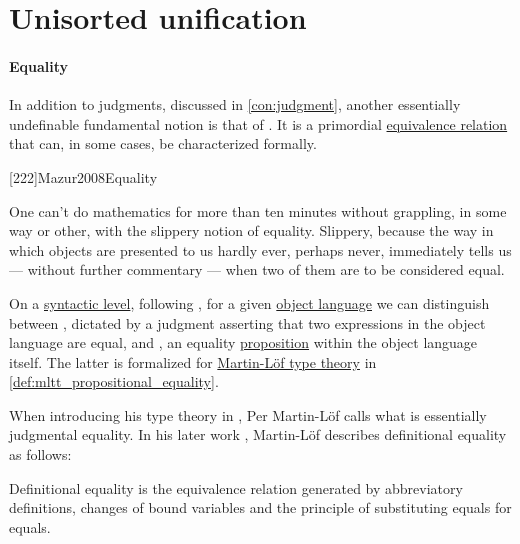 \section{Unisorted unification}\label{sec:unisorted_unification}

\paragraph{Equality}

\begin{concept}\label{con:equality}
  In addition to judgments, discussed in \cref{con:judgment}, another essentially undefinable fundamental notion is that of . It is a primordial \hyperref[def:equivalence_relation]{equivalence relation} that can, in some cases, be characterized formally.

  [222]{Mazur2008Equality}
  \begin{displayquote}
    One can't do mathematics for more than ten minutes without grappling, in some way or other, with the slippery notion of equality. Slippery, because the way in which objects are presented to us hardly ever, perhaps never, immediately tells us --- without further commentary --- when two of them are to be considered equal.
  \end{displayquote}

  On a \hyperref[con:syntax_semantics_duality]{syntactic level}, following \cite[19]{UnivalentFoundationsProgram2013HoTT}, for a given \hyperref[con:metalanguage]{object language} we can distinguish between , dictated by a judgment asserting that two expressions in the object language are equal, and , an equality \hyperref[con:proposition]{proposition} within the object language itself. The latter is formalized for \hyperref[def:martin_lof_type_theory]{Martin-L\"of type theory} in \cref{def:mltt_propositional_equality}.

  When introducing his type theory in \cite[85]{MartinLöf1984IntuitionisticTypeTheory}, Per Martin-L\"of calls  what is essentially judgmental equality. In his later work \cite[40]{MartinLöf1984IntuitionisticTypeTheory}, Martin-L\"of describes definitional equality as follows:
  \begin{displayquote}
    Definitional equality is the equivalence relation generated by abbreviatory definitions, changes of bound variables and the principle of substituting equals for equals.
  \end{displayquote}


\end{concept}
